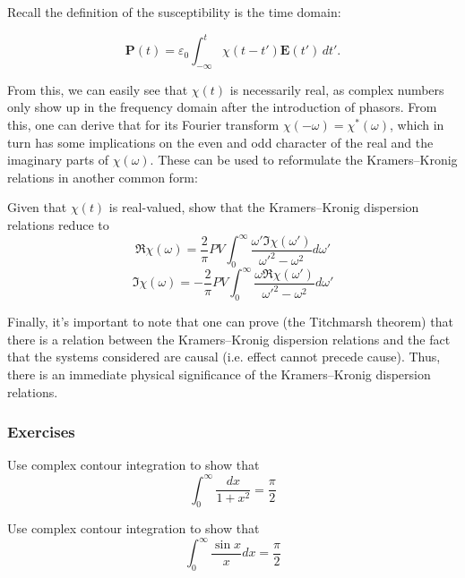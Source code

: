 Recall the definition of the susceptibility is the time domain:

\begin{equation}
\mathbf{P}(t)=\varepsilon_0 \int_{-\infty}^t \chi(t-t') \mathbf{E}(t')\, dt'.
\end{equation}

From this, we can easily see that $\chi(t)$ is necessarily real, as complex
numbers only show up in the frequency domain after the introduction of phasors.
From this, one can derive that for its Fourier transform $\chi(-\omega) =
\chi^*(\omega)$, which in turn has some implications on the even and odd
character of the real and the imaginary parts of $\chi(\omega)$. These can be
used to reformulate the Kramers--Kronig relations in another common form:

\begin{sidebar}
\begin{ex}
Given that $\chi(t)$ is real-valued, show that the Kramers--Kronig dispersion relations reduce to
$$\Re \chi(\omega) =  \frac{2}{\pi} PV \int_{0}^{\infty}{ \frac{\omega'\Im \chi(\omega')}{\omega'^2-\omega^2}d\omega'}$$
$$\Im \chi(\omega) = -\frac{2}{\pi} PV \int_{0}^{\infty}{ \frac{\omega \Re \chi(\omega')}{\omega'^2-\omega^2}d\omega'}$$
\end{ex}
\end{sidebar}

Finally, it's important to note that one can prove (the Titchmarsh theorem) that
there is a relation between the Kramers--Kronig dispersion relations and the
fact that the systems considered are causal (i.e. effect cannot precede cause).
Thus, there is an immediate physical significance of the Kramers--Kronig
dispersion relations.

\subsubsection{Exercises}

\begin{sidebar}
\begin{ex}
Use complex contour integration to show that
$$ \int_0^{\infty} \frac{dx}{1+x^2} = \frac{\pi}{2}$$
\end{ex}
\end{sidebar}

\begin{sidebar}
\begin{ex}
Use complex contour integration to show that
$$ \int_0^{\infty} \frac{\sin x}{x} dx = \frac{\pi}{2}$$
\end{ex}
\end{sidebar}

